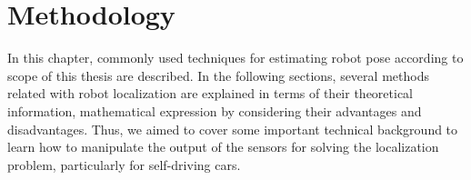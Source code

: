 \chapter{Methodology}\label{chp:3}
In this chapter, commonly used techniques for estimating robot pose according to scope of this thesis are described. In the following sections, several methods related with robot localization are explained in terms of their theoretical information, mathematical expression by considering their advantages and disadvantages. Thus, we aimed to cover some important technical background to learn how to manipulate the output of the sensors for solving the localization problem, particularly for self-driving cars.
